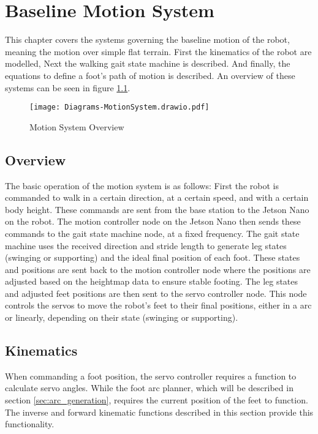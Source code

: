 \chapter{Baseline Motion System} \label{chap:motion}
    This chapter covers the systems governing the baseline motion of the robot, meaning the motion over simple flat terrain. First the kinematics of the robot are modelled, Next the walking gait state machine is described. And finally, the equations to define a foot's path of motion is described. An overview of these systems can be seen in figure \ref{fig:motion_system}.
    \begin{figure}[h]
        \centering
        \texttt{[image: Diagrams-MotionSystem.drawio.pdf]}
        \caption{Motion System Overview}
        \label{fig:motion_system}
    \end{figure}
    \section{Overview}
        The basic operation of the motion system is as follows: First the robot is commanded to walk in a certain direction, at a certain speed, and with a certain body height. These commands are sent from the base station to the Jetson Nano on the robot. The motion controller node on the Jetson Nano then sends these commands to the gait state machine node, at a fixed frequency. The gait state machine uses the received direction and stride length to generate leg states (swinging or supporting) and the ideal final position of each foot. These states and positions are sent back to the motion controller node where the positions are adjusted based on the heightmap data to ensure stable footing. The leg states and adjusted feet positions are then sent to the servo controller node. This node controls the servos to move the robot's feet to their final positions, either in a arc or linearly, depending on their state (swinging or supporting). %

    \section{Kinematics}
        When commanding a foot position, the servo controller requires a function to calculate servo angles. While the foot arc planner, which will be described in section \ref{sec:arc_generation}, requires the current position of the feet to function. The inverse and forward kinematic functions described in this section provide this functionality. 
        
